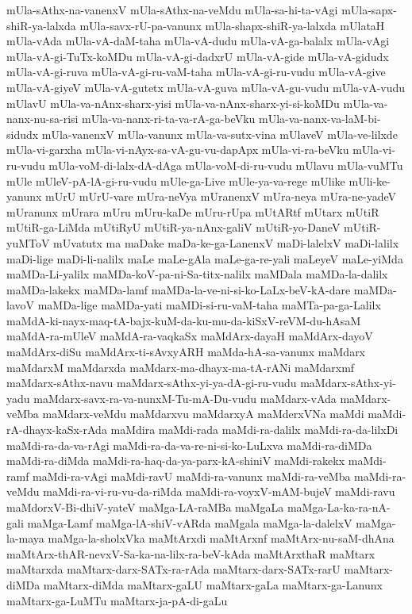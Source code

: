 {mUla-sAthx-na-vanenxV
mUla-sAthx-na-veMdu
mUla-sa-hi-ta-vAgi
mUla-sapx-shiR-ya-lalxda
mUla-savx-rU-pa-vanunx
mUla-shapx-shiR-ya-lalxda
mUlataH
mUla-vAda
mUla-vA-daM-taha
mUla-vA-dudu
mUla-vA-ga-balalx
mUla-vAgi
mUla-vA-gi-TuTx-koMDu
mUla-vA-gi-dadxrU
mUla-vA-gide
mUla-vA-gidudx
mUla-vA-gi-ruva
mUla-vA-gi-ru-vaM-taha
mUla-vA-gi-ru-vudu
mUla-vA-give
mUla-vA-giyeV
mUla-vA-gutetx
mUla-vA-guva
mUla-vA-gu-vudu
mUla-vA-vudu
mUlavU
mUla-va-nAnx-sharx-yisi
mUla-va-nAnx-sharx-yi-si-koMDu
mUla-va-nanx-nu-sa-risi
mUla-va-nanx-ri-ta-va-rA-ga-beVku
mUla-va-nanx-va-laM-bi-sidudx
mUla-vanenxV
mUla-vanunx
mUla-va-sutx-vina
mUlaveV
mUla-ve-lilxde
mUla-vi-garxha
mUla-vi-nAyx-sa-vA-gu-vu-dapApx
mUla-vi-ra-beVku
mUla-vi-ru-vudu
mUla-voM-di-lalx-dA-dAga
mUla-voM-di-ru-vudu
mUlavu
mUla-vuMTu
mUle
mUleV-pA-lA-gi-ru-vudu
mUle-ga-Live
mUle-ya-va-rege
mUlike
mUli-ke-yanunx
mUrU
mUrU-vare
mUra-neVya
mUranenxV
mUra-neya
mUra-ne-yadeV
mUranunx
mUrara
mUru
mUru-kaDe
mUru-rUpa
mUtARtf
mUtarx
mUtiR
mUtiR-ga-LiMda
mUtiRyU
mUtiR-ya-nAnx-galiV
mUtiR-yo-DaneV
mUtiR-yuMToV
mUvatutx
ma
maDake
maDa-ke-ga-LanenxV
maDi-lalelxV
maDi-lalilx
maDi-lige
maDi-li-nalilx
maLe
maLe-gAla
maLe-ga-re-yali
maLeyeV
maLe-yiMda
maMDa-Li-yalilx
maMDa-koV-pa-ni-Sa-titx-nalilx
maMDala
maMDa-la-dalilx
maMDa-lakekx
maMDa-lamf
maMDa-la-ve-ni-si-ko-LaLx-beV-kA-dare
maMDa-lavoV
maMDa-lige
maMDa-yati
maMDi-si-ru-vaM-taha
maMTa-pa-ga-Lalilx
maMdA-ki-nayx-maq-tA-bajx-kuM-da-ku-mu-da-kiSxV-reVM-du-hAsaM
maMdA-ra-mUleV
maMdA-ra-vaqkaSx
maMdArx-dayaH
maMdArx-dayoV
maMdArx-diSu
maMdArx-ti-sAvxyARH
maMda-hA-sa-vanunx
maMdarx
maMdarxM
maMdarxda
maMdarx-ma-dhayx-ma-tA-rANi
maMdarxmf
maMdarx-sAthx-navu
maMdarx-sAthx-yi-ya-dA-gi-ru-vudu
maMdarx-sAthx-yi-yadu
maMdarx-savx-ra-va-nunxM-Tu-mA-Du-vudu
maMdarx-vAda
maMdarx-veMba
maMdarx-veMdu
maMdarxvu
maMdarxyA
maMderxVNa
maMdi
maMdi-rA-dhayx-kaSx-rAda
maMdira
maMdi-rada
maMdi-ra-dalilx
maMdi-ra-da-lilxDi
maMdi-ra-da-va-rAgi
maMdi-ra-da-va-re-ni-si-ko-LuLxva
maMdi-ra-diMDa
maMdi-ra-diMda
maMdi-ra-haq-da-ya-parx-kA-shiniV
maMdi-rakekx
maMdi-ramf
maMdi-ra-vAgi
maMdi-ravU
maMdi-ra-vanunx
maMdi-ra-veMba
maMdi-ra-veMdu
maMdi-ra-vi-ru-vu-da-riMda
maMdi-ra-voyxV-mAM-bujeV
maMdi-ravu
maMdorxV-Bi-dhiV-yateV
maMga-LA-raMBa
maMgaLa
maMga-La-ka-ra-nA-gali
maMga-Lamf
maMga-lA-shiV-vARda
maMgala
maMga-la-dalelxV
maMga-la-maya
maMga-la-sholxVka
maMtArxdi
maMtArxnf
maMtArx-nu-saM-dhAna
maMtArx-thAR-nevxV-Sa-ka-na-lilx-ra-beV-kAda
maMtArxthaR
maMtarx
maMtarxda
maMtarx-darx-SATx-ra-rAda
maMtarx-darx-SATx-rarU
maMtarx-diMDa
maMtarx-diMda
maMtarx-gaLU
maMtarx-gaLa
maMtarx-ga-Lanunx
maMtarx-ga-LuMTu
maMtarx-ja-pA-di-gaLu
}
